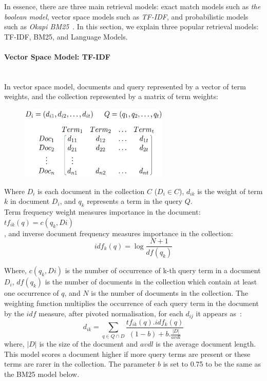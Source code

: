 In essence, there are three main retrieval models: exact match models such as \textit{the boolean model}, vector space models such as \textit{TF-IDF}, and probabilistic models such as \textit{Okapi BM25}~\citep{croft2010search}. In this section, we explain three popular retrieval models: TF-IDF, BM25, and Language Models.   

\paragraph{Vector Space Model: TF-IDF}
\ \\
In vector space model, documents and query represented by a vector of term weights, and the collection represented by a matrix of term weights: 
\capstartfalse
\begin{figure}[htpb]
   \centering
   \includegraphics[width=.45\textwidth,height=35mm]{figs/vsm-matrix.jpg}
\end{figure}
\capstarttrue
\FloatBarrier 

Where $ D_{i} $ is each document in the collection $ C $ ($ D_{i}\in C $), $ d_{ik} $ is the weight of term $ k $ in document $ D_{i} $, and $ q_{k} $ represents a term in the query $ Q $.\\
Term frequency weight measures importance in the document: \,\,\,
$ tf_{ik}(q)=c(q_{k},Di)$ 
\\, and inverse document frequency measures importance in the collection:\,\,\,\,\,\, 
\begin{equation}
idf_{k}(q)=\log\frac{N+1}{df(q_{k})}
\label{eq:idf}
\end{equation}

Where, $ c(q_{k},Di) $ is the number of occurrence of k-th query term in a document $ D_{i} $, $ df(q_{k}) $ is the number of documents in the collection which contain at least one occurrence of $ q $, and $ N $ is the number of documents in the collection. The weighting function multiplies the occurrence of each query term in the document
by the $ idf $ measure, after pivoted normalisation, for each $ d_{ij} $ it appears as~\citep{bache2010improving}:
\begin{equation}
d_{ik}=\sum\limits_{q \in Q\cap D}\frac{tf_{ik}(q).idf_{k}(q)}{(1-b)+b.\frac{|D|}{avdl}}
\label{eq:tfidf}
\end{equation}
where, $ |D| $ is the size of the document and $ avdl $ is the average document length. This model scores a document higher if more query terms are present or these terms are rarer in the collection. The parameter $ b $ is set to 0.75 to be the same as the BM25 model below.

